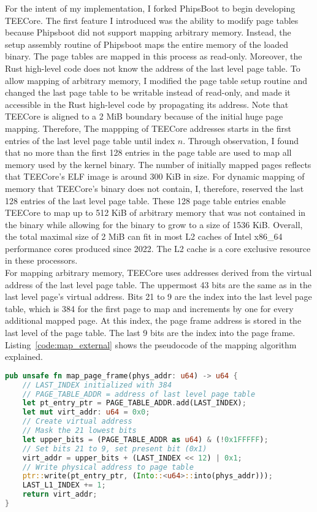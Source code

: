 For the intent of my implementation, I forked PhipsBoot to begin developing
TEECore. The first feature I introduced was the ability to modify page tables
because Phipsboot did not support mapping arbitrary memory. Instead, the setup
assembly routine of Phipsboot maps the entire memory of the loaded binary. The
page tables are mapped in this process as read-only. Moreover, the Rust
high-level code does not know the address of the last level page table. To allow
mapping of arbitrary memory, I modified the page table setup routine and changed
the last page table to be writable instead of read-only, and made it accessible
in the Rust high-level code by propagating its address. Note that TEECore is
aligned to a 2 MiB boundary because of the initial huge page mapping. Therefore,
The mappping of TEECore addresses starts in the first entries of the last level
page table until index $n$. Through observation, I found that no more than the
first 128 entries in the page table are used to map all memory used by the
kernel binary. The number of initially mapped pages reflects that TEECore's ELF
image is around 300 KiB in size. For dynamic mapping of memory that TEECore's
binary does not contain, I, therefore, reserved the last 128 entries of the last
level page table. These 128 page table entries enable  TEECore to map up to 512
KiB of arbitrary memory that was not contained in the binary while allowing for
the binary to grow to a size of 1536 KiB. Overall, the total maximal size of 2
MiB can fit in most L2 caches of Intel x86\_64 performance cores produced since
2022. The L2 cache is a core exclusive resource in these processors.\\

For mapping arbitrary memory, TEECore uses addresses derived from the virtual
address of the last level page table. The uppermost 43 bits are the same as in
the last level page's virtual address. Bits 21 to 9 are the index into the last
level page table, which is 384 for the first page to map and increments by one
for every additional mapped page. At this index, the page frame address is
stored in the last level of the page table. The last 9 bits are the index into
the page frame. Listing~\ref{code:map_external} shows the pseudocode of the
mapping algorithm explained.

\begin{lstlisting}[language=Rust, caption=Mapping of external memory, label=code:map_external]
pub unsafe fn map_page_frame(phys_addr: u64) -> u64 {
    // LAST_INDEX initialized with 384
    // PAGE_TABLE_ADDR = address of last level page table
    let pt_entry_ptr = PAGE_TABLE_ADDR.add(LAST_INDEX);
    let mut virt_addr: u64 = 0x0;
    // Create virtual address
    // Mask the 21 lowest bits
    let upper_bits = (PAGE_TABLE_ADDR as u64) & (!0x1FFFFF);
    // Set bits 21 to 9, set present bit (0x1)
    virt_addr = upper_bits + (LAST_INDEX << 12) | 0x1;
    // Write physical address to page table
    ptr::write(pt_entry_ptr, (Into::<u64>::into(phys_addr)));
    LAST_L1_INDEX += 1;
    return virt_addr;
}
\end{lstlisting}

